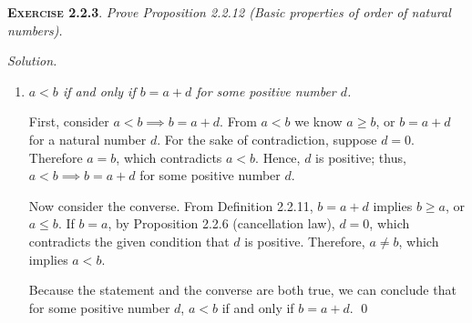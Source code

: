 \documentclass[12pt]{article}
\newcommand{\succr}[1]{#1 \textrm{++}}
\theoremstyle{remark}
\newenvironment{exer}[2]{
    \noindent \setlength{\parskip}{1em}%
    \textsc{\textbf{Exercise #1}}. \textit{#2} \par
    \noindent \textit{Solution.} %
}{\bigskip}
\begin{document}
\begin{exer}{2.2.3}{
    Prove Proposition 2.2.12 (Basic properties of order of natural numbers).
}
\begin{enumerate}[label=(\alph*)]
            First, consider $a < b \implies \succr{a} \le b$.
            According to Definition 2.2.11, if $a < b$, then $b = a + m$, where $m$ is a natural number. 
            Note that $m \ne 0$ because we would otherwise obtain $a = b$, which is contradictory to the given condition $a < b$.
            Therefore, by Axiom 2.3, we have $m = \succr{n}$, where $n$ is a natural number.
            Thus, by the definition and commutativity of addition, $b = a + \succr{n} = \succr{(a + n)} = (\succr{a}) + n$.
            It follows that $\succr{a} \le b$.

            Now consider the converse.
            From $\succr{a} \le b$, we obtain $b = \succr{a} + p$, where $p$ is a natural number.
            Thus, by the definition and commutativity of addition, $b = \succr{a} + p = \succr{(a + p)} = a + \succr{p}$.
            According to Axiom 2.3, $0$ is not the successor of any natural number, so $\succr{p} \ne 0$.
            Hence, $a \le b$.

            Because $a < b \implies \succr{a} \le b$ and $\succr{a} \le b \implies a < b$, $a < b \iff \succr{a} \le {b}.$

        \item \textit{$a < b$ if and only if $b = a + d$ for some positive number $d$.}

            First, consider $a < b \implies b = a + d$. 
            From $a < b$ we know $a \ge b$, or $b = a + d$ for a natural number $d$.
            For the sake of contradiction, suppose $d = 0$.
            Therefore $a = b$, which contradicts $a < b$.
            Hence, $d$ is positive; thus, $a < b \implies b = a + d$ for some positive number $d$.

            Now consider the converse.
            From Definition 2.2.11, $b = a + d$ implies $b \ge a$, or $a \le b$.
            If $b = a$, by Proposition 2.2.6 (cancellation law), $d = 0$, which contradicts the given condition that $d$ is positive.
            Therefore, $a \ne b$, which implies $a < b$.

            Because the statement and the converse are both true, we can conclude that for some positive number $d$, $a < b$ if and only if $b = a + d$. \qed
            
    \end{enumerate}
\end{exer}
\end{document}
